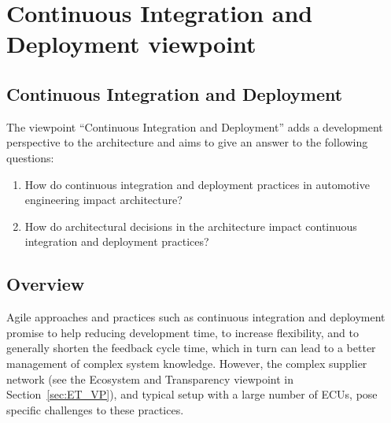
\section{Continuous Integration and Deployment viewpoint}\label{sec:CID_VP}
\renewcommand{\Fillin}[1]{{Continuous Integration and Deployment}}
\subsection{\Fillin{Viewpoint Name}}\label{vp:template}



The viewpoint ``Continuous Integration and Deployment'' adds a development perspective to the  architecture and aims to give an answer to the following questions:
\begin{enumerate}
\item How do continuous integration and deployment practices in automotive engineering impact  architecture?
\item How do architectural decisions in the  architecture impact continuous integration and deployment practices?
\end{enumerate}

\subsection{Overview} 

Agile approaches and practices such as continuous integration and deployment promise to help reducing development time, to increase flexibility, and to generally shorten the feedback cycle time, which in turn can lead to a better management of complex system knowledge. 
However, the  complex supplier network (see the Ecosystem and Transparency viewpoint in Section~\ref{sec:ET_VP}),
and typical setup with a large number of ECUs,
pose specific challenges to %
these practices. %

